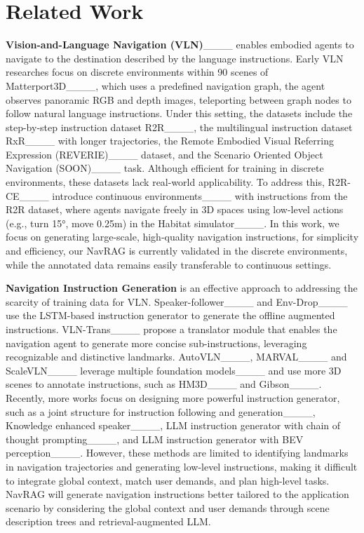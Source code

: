 \section{Related Work}
\noindent \textbf{Vision-and-Language Navigation (VLN)}____ enables embodied agents to navigate to the destination described by the language instructions.
Early VLN researches focus on discrete environments within 90 scenes of Matterport3D____, which uses a predefined navigation graph, the agent observes panoramic RGB and depth images, teleporting between graph nodes to follow natural language instructions. Under this setting, the datasets include the step-by-step instruction dataset R2R____,  the multilingual instruction dataset RxR____ with longer trajectories, the Remote Embodied Visual Referring Expression (REVERIE)____ dataset, and the Scenario Oriented Object Navigation (SOON)____ task.
Although efficient for training in discrete environments, these datasets lack real-world applicability. To address this, R2R-CE____ introduce continuous environments____ with instructions from the R2R dataset, where agents navigate freely in 3D spaces using low-level actions (e.g., turn 15°, move 0.25m) in the Habitat simulator____. %
In this work, we focus on generating large-scale, high-quality navigation instructions, for simplicity and efficiency, our NavRAG is currently validated in the discrete environments, while the annotated data remains easily transferable to continuous settings.

\noindent \textbf{Navigation Instruction Generation} is an effective approach to addressing the scarcity of training data for VLN. Speaker-follower____ and Env-Drop____ use the LSTM-based instruction generator to generate the offline augmented instructions. VLN-Trans____ propose a translator module that enables the navigation agent to generate more concise sub-instructions, leveraging recognizable and distinctive landmarks. 
AutoVLN____, MARVAL____ and ScaleVLN____ leverage multiple foundation models____ and use more 3D scenes to annotate instructions, such as HM3D____ and Gibson____. Recently, more works focus on designing more powerful instruction generator, such as a joint structure for instruction following and generation____, Knowledge enhanced speaker____, LLM instruction generator with chain of thought prompting____, and LLM instruction generator with BEV perception____. However, these methods are limited to identifying landmarks in navigation trajectories and generating low-level instructions, making it difficult to integrate global context, match user demands, and plan high-level tasks. NavRAG will generate navigation instructions better tailored to the application scenario by considering the global context and user demands through scene description trees and retrieval-augmented LLM.


